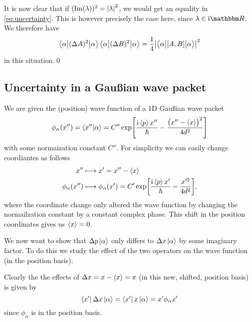 \documentclass[11pt,letter, swedish, english
]{article}
\begin{document}
It is now clear that if $(\Im(\lambda))^2=\abs{\lambda}^2$, we would
get an equality in \eqref{eq:uncertainty}. This is however precisely
the case here, since $\lambda\in\ii\R$. We therefore have
\begin{equation} 
\ev**{(\Delta{A})^2}{\alpha}\ev**{(\Delta{B})^2}{\alpha} 
= \frac{1}{4} \abs{\ev**{\comm{A}{B}}{\big.\alpha}}^2
\end{equation}
in this situation.\qed

\subsection{Uncertainty in a Gaußian wave packet}
We are given the (position) wave function of a 1D Gaußian wave packet
\begin{equation}
\phi_\alpha(x'') = \braket{x''}{\alpha} 
= C'' \exp[\frac{\ii\ev{p}x''}{\hbar}-\frac{\big(x''-\ev{x}\!\big)^2}{4d^2}]
\end{equation}
with some normaization constant $C''$. For simplicity we can easily
change coordiantes as follows
\begin{equation}
\begin{aligned}
x'' \longmapsto&\; x'=x''-\ev{x}\\
\phi_\alpha(x'') \longmapsto&\; \phi_\alpha(x') 
= C' \exp[\frac{\ii\ev{p}x'}{\hbar}-\frac{x'^2}{4d^2}],
\end{aligned}
\end{equation}
where the coordinate change only altered the wave function by
changing the normailzation constant by a constant complex phase. This
shift in the position coordinates gives us $\ev{x}=0$.

We now want to show that $\Delta{p}\ket{\alpha}$ only differs to
$\Delta{x}\ket{\alpha}$ by some imaginary factor. To do this we study
the effect of the two operators on the wave function (in the position
basis). 

Clearly the the effects of $\Delta{x}=x-\ev{x}=x$ (in this new,
shifted, position basis) is given by
\begin{equation}
\bra{x'}\Delta{x}\ket{\alpha} = \bra{x'}x\ket{\alpha} = x'\phi_\alpha{x'}
\end{equation}
since $\phi_\alpha$ is in the position basis. 
\end{document}
